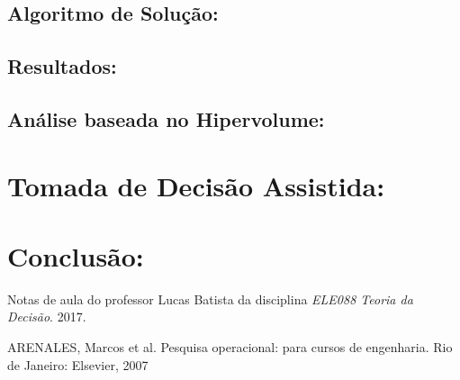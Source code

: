 \documentclass[conference]{IEEEtran}
\begin{document}
\subsection{Algoritmo de Solução:}


\subsection{Resultados:}


\subsection{Análise baseada no Hipervolume:}


\section{Tomada de Decisão Assistida:}


\section{Conclusão:}


\begin{thebibliography}{1}

Notas de aula do professor Lucas Batista da disciplina \emph{ELE088 Teoria da Decisão}. 2017.

ARENALES, Marcos et al. Pesquisa operacional: para cursos de engenharia. Rio de Janeiro: Elsevier, 2007

\end{thebibliography}


\end{document}
